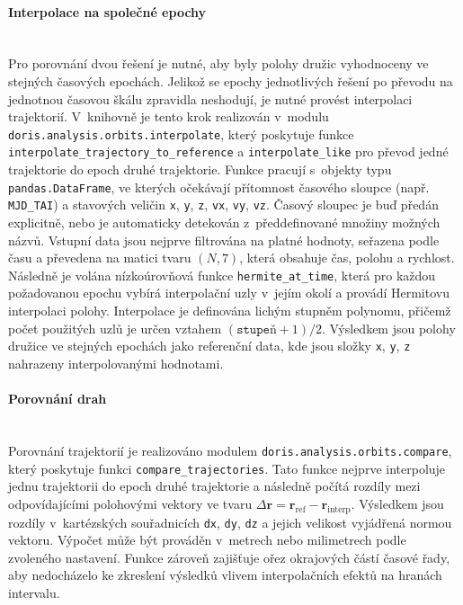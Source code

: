 \paragraph{Interpolace na společné epochy}\leavevmode\\
Pro porovnání dvou řešení je nutné, aby byly polohy družic vyhodnoceny ve stejných časových epochách. Jelikož se epochy jednotlivých řešení po převodu na jednotnou časovou škálu zpravidla neshodují, je nutné provést interpolaci trajektorií. V~knihovně je tento krok realizován v~modulu \texttt{doris.analysis.orbits.interpolate}, který poskytuje funkce \texttt{interpolate\_trajectory\_to\_reference} a \texttt{interpolate\_like} pro převod jedné trajektorie do epoch druhé trajektorie. Funkce pracují s~objekty typu \texttt{pandas.DataFrame}, ve kterých očekávají přítomnost časového sloupce (např.
\texttt{MJD\_TAI}) a stavových veličin \texttt{x}, \texttt{y}, \texttt{z}, \texttt{vx}, \texttt{vy}, \texttt{vz}. Časový sloupec je buď předán explicitně, nebo je automaticky detekován z~předdefinované množiny možných názvů. Vstupní data jsou nejprve filtrována na platné hodnoty, seřazena podle času a převedena na matici tvaru \((N,7)\), která obsahuje čas, polohu a rychlost. Následně je volána nízkoúrovňová funkce \texttt{hermite\_at\_time}, která pro každou požadovanou epochu vybírá
interpolační uzly v~jejím okolí a provádí Hermitovu interpolaci polohy. Interpolace je definována lichým stupněm polynomu, přičemž počet použitých uzlů je určen vztahem \((\texttt{stupeň}+1)/2\). Výsledkem jsou polohy družice ve stejných epochách jako referenční data, kde jsou složky \texttt{x}, \texttt{y}, \texttt{z} nahrazeny interpolovanými hodnotami.

\paragraph{Porovnání drah}\leavevmode\\
Porovnání trajektorií je realizováno modulem \texttt{doris.analysis.orbits.compare}, který poskytuje funkci \texttt{compare\_trajectories}. Tato funkce nejprve interpoluje jednu trajektorii do epoch druhé trajektorie a následně počítá rozdíly mezi odpovídajícími polohovými vektory ve tvaru $\Delta \mathbf{r} = \mathbf{r}_{\text{ref}} - \mathbf{r}_{\text{interp}}$. Výsledkem jsou rozdíly v~kartézských souřadnicích \texttt{dx}, \texttt{dy}, \texttt{dz} a jejich velikost vyjádřená normou vektoru. Výpočet může být prováděn v~metrech nebo milimetrech podle zvoleného nastavení. Funkce zároveň zajišťuje ořez okrajových částí časové řady, aby nedocházelo ke zkreslení výsledků vlivem interpolačních efektů na hranách intervalu.

